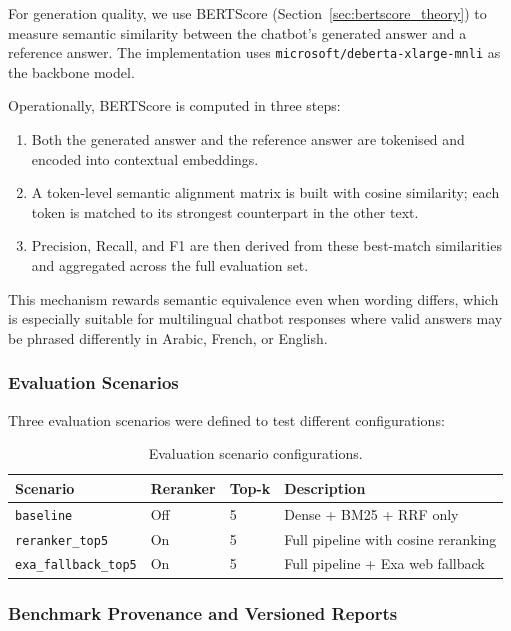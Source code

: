 \documentclass[12pt, a4paper]{article}
\begin{document}
For generation quality, we use BERTScore
(Section~\ref{sec:bertscore_theory}) to measure semantic similarity between
the chatbot's generated answer and a reference answer. The implementation
uses \texttt{microsoft/deberta-xlarge-mnli} as the backbone model.

Operationally, BERTScore is computed in three steps:
\begin{enumerate}[leftmargin=2em]
      \item Both the generated answer and the reference answer are tokenised and encoded into contextual embeddings.
      \item A token-level semantic alignment matrix is built with cosine similarity; each token is matched to its strongest counterpart in the other text.
      \item Precision, Recall, and F1 are then derived from these best-match similarities and aggregated across the full evaluation set.
\end{enumerate}

This mechanism rewards semantic equivalence even when wording differs,
which is especially suitable for multilingual chatbot responses where valid
answers may be phrased differently in Arabic, French, or English.

\subsubsection{Evaluation Scenarios}

Three evaluation scenarios were defined to test different configurations:

\begin{table}[H]
\centering
\caption{Evaluation scenario configurations.}
\small
\begin{tabularx}{\textwidth}{l C{2.5cm} C{2cm} X}
\toprule
{}\color{white}\textbf{Scenario} & \color{white}\textbf{Reranker} & \color{white}\textbf{Top-k} & \color{white}\textbf{Description} \\
\midrule
\texttt{baseline} & Off & 5 & Dense + BM25 + RRF only \\
\texttt{reranker\_top5} & On & 5 & Full pipeline with cosine reranking \\
\texttt{exa\_fallback\_top5} & On & 5 & Full pipeline + Exa web fallback \\
\bottomrule
\end{tabularx}
\end{table}

\subsubsection{Benchmark Provenance and Versioned Reports}
\end{document}
